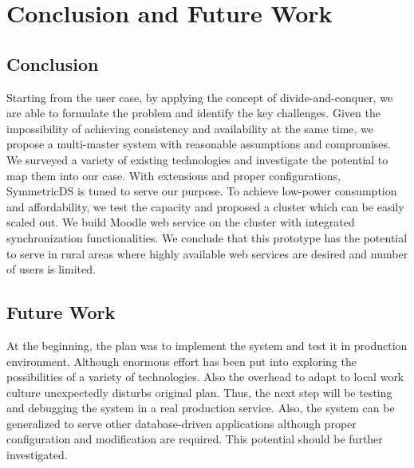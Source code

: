 \chapter{Conclusion and Future Work}\label{conclusion}
\section{Conclusion}
Starting from the user case, by applying the concept of divide-and-conquer, we are able to formulate the problem and identify the key challenges. Given the impossibility of achieving consistency and availability at the same time, we propose a multi-master system with reasonable assumptions and compromises. We surveyed a variety of existing technologies and investigate the potential to map them into our case. With extensions and proper configurations, SymmetricDS is tuned to serve our purpose. To achieve low-power consumption and affordability, we test the capacity and proposed a cluster which can be easily scaled out. We build Moodle web service on the cluster with integrated synchronization functionalities. We conclude that this prototype has the potential to serve in rural areas where highly available web services are desired and number of users is limited.
\section{Future Work}
At the beginning, the plan was to implement the system and test it in production environment. Although enormous effort has been put into exploring the possibilities of a variety of technologies. Also the overhead to adapt to local work culture unexpectedly disturbs original plan. Thus, the next step will be testing and debugging the system in a real production service. Also, the system can be generalized to serve other database-driven applications although proper configuration and modification are required. This potential should be further investigated.
